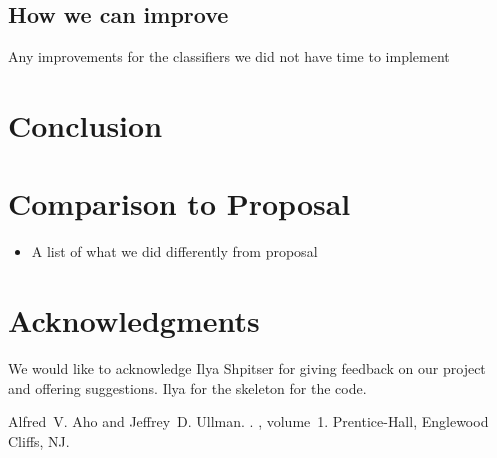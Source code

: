 \documentclass[11pt,letterpaper]{article}
\begin{document}
\subsection{How we can improve}
Any improvements for the classifiers we did not have time to implement

\section{Conclusion}

\section{Comparison to Proposal}

\begin{itemize}
\item A list of what we did differently from proposal
\end{itemize}

\section*{Acknowledgments}
We would like to acknowledge Ilya Shpitser for giving feedback on our project and offering suggestions. Ilya for the skeleton for the code.

\begin{thebibliography}{}

Alfred~V. Aho and Jeffrey~D. Ullman.
.
, volume~1.
\newblock Prentice-{Hall}, Englewood Cliffs, NJ.

\end{thebibliography}
\end{document}
